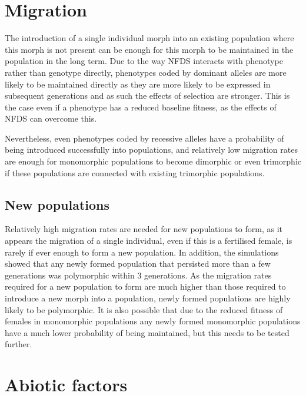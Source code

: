 \documentclass{article}
\begin{document}
\section{Migration}
The introduction of a single individual morph into an existing population where this morph is not present can be enough for this morph to be maintained in the population in the long term. Due to the way NFDS interacts with phenotype rather than genotype directly, phenotypes coded by dominant alleles are more likely to be maintained directly as they are more likely to be expressed in subsequent generations and as such the effects of selection are stronger. This is the case even if a phenotype has a reduced baseline fitness, as the effects of NFDS can overcome this.

Nevertheless, even phenotypes coded by recessive alleles have a probability of being introduced successfully into populations, and relatively low migration rates are enough for monomorphic populations to become dimorphic or even trimorphic if these populations are connected with existing trimorphic populations.

\subsection{New populations}
Relatively high migration rates are needed for new populations to form, as it appears the migration of a single individual, even if this is a fertilised female, is rarely if ever enough to form a new population. In addition, the simulations showed that any newly formed population that persisted more than a few generations was polymorphic within 3 generations. As the migration rates required for a new population to form are much higher than those required to introduce a new morph into a population, newly formed populations are highly likely to be polymorphic. It is also possible that due to the reduced fitness of females in monomorphic populations any newly formed monomorphic populations have a much lower probability of being maintained, but this needs to be tested further.

\section{Abiotic factors}

\end{document}
